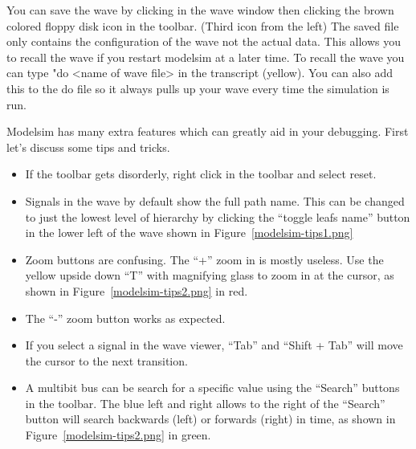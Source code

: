 \documentclass{article}
\begin{document}
You can save the wave by clicking in the wave window then clicking the
brown colored floppy disk icon in the toolbar.  (Third icon from the
left)  The saved file only contains the configuration of the wave not
the actual data. This allows you to recall the wave if you restart
modelsim at a later time.  To recall the wave you can type "do <name
of wave file> in the transcript (yellow).  You can also add this to
the do file so it always pulls up your wave every time the simulation
is run.

Modelsim has many extra features which can greatly aid in your debugging.
First let's discuss some tips and tricks.
\begin{itemize}
\item  If the toolbar gets disorderly, right click in the toolbar and
  select reset.
\item Signals in the wave by default show the full path name.  This can
  be changed to just the lowest level of hierarchy by clicking the
  ``toggle leafs name'' button in the lower left of the wave shown in
  Figure~\ref{modelsim-tips1.png}  
\item Zoom buttons are confusing.  The ``+'' zoom in is mostly useless.
  Use the yellow upside down ``T'' with magnifying glass to zoom in
  at the cursor, as shown in Figure~\ref{modelsim-tips2.png} in red.
\item The ``-'' zoom button works as expected.
\item If you select a signal in the wave viewer, ``Tab'' and ``Shift + Tab''
  will move the cursor to the next transition.
\item A multibit bus can be search for a specific value using the ``Search''
  buttons in the toolbar.  The blue left and right allows to the right of
  the ``Search'' button will search backwards (left) or forwards (right)
  in time, as shown in Figure~\ref{modelsim-tips2.png} in green.
\end{itemize}
\end{document}
